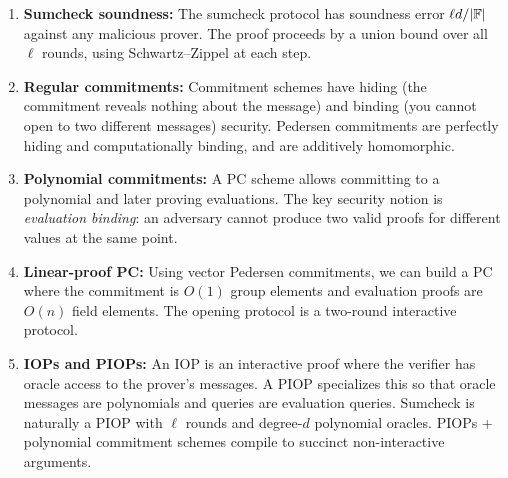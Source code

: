 \documentclass[11pt]{article}
\begin{document}
\begin{importantbox}
\begin{enumerate}
  \item \textbf{Sumcheck soundness:} The sumcheck protocol has soundness error $\ell d / |\mathbb{F}|$ against any malicious prover.  The proof proceeds by a union bound over all $\ell$ rounds, using Schwartz--Zippel at each step.

  \item \textbf{Regular commitments:} Commitment schemes have hiding (the commitment reveals nothing about the message) and binding (you cannot open to two different messages) security.  Pedersen commitments are perfectly hiding and computationally binding, and are additively homomorphic.

  \item \textbf{Polynomial commitments:} A PC scheme allows committing to a polynomial and later proving evaluations.  The key security notion is \emph{evaluation binding}: an adversary cannot produce two valid proofs for different values at the same point.

  \item \textbf{Linear-proof PC:} Using vector Pedersen commitments, we can build a PC where the commitment is $O(1)$ group elements and evaluation proofs are $O(n)$ field elements.  The opening protocol is a two-round interactive protocol.

  \item \textbf{IOPs and PIOPs:} An IOP is an interactive proof where the verifier has oracle access to the prover's messages.  A PIOP specializes this so that oracle messages are polynomials and queries are evaluation queries.  Sumcheck is naturally a PIOP with $\ell$ rounds and degree-$d$ polynomial oracles.  PIOPs + polynomial commitment schemes compile to succinct non-interactive arguments.
\end{enumerate}
\end{importantbox}
\end{document}

